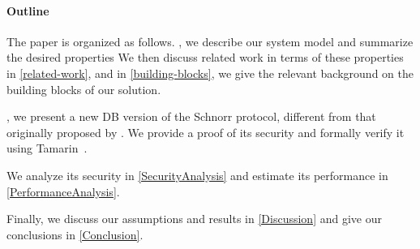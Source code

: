 \paragraph*{Outline}

The paper is organized as follows.
, we describe our system model and summarize the desired 
properties 
We then discuss related work in terms of these properties in 
\cref{related-work}, and in \cref{building-blocks}, we give 
the relevant background on the building blocks of our solution.

, we present a new \ac{DB} version of the Schnorr protocol, 
different from that originally proposed by \textcite{DistanceBounding}.
We provide a proof of its security and formally verify it using 
Tamarin~\cite{TamarinDB}.

We analyze its security in \cref{SecurityAnalysis} and estimate its performance 
in \cref{PerformanceAnalysis}.

Finally, we discuss our assumptions and results in \cref{Discussion} and give 
our conclusions in \cref{Conclusion}.
